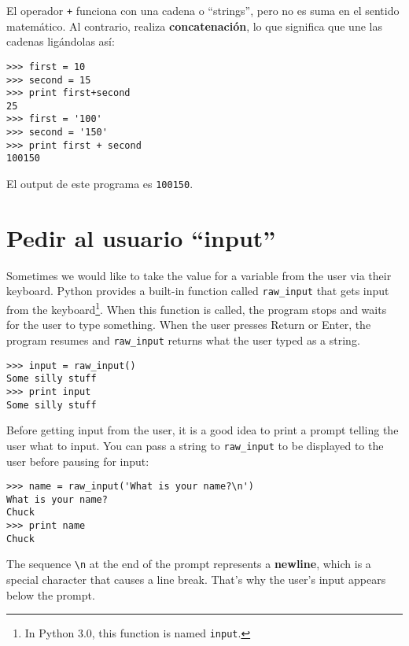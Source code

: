 \begin{ex}
El operador {\tt +} funciona con una cadena o ``strings'', pero no es suma en el sentido matem\'atico. Al contrario, realiza 
{\bf concatenaci\'on}, lo que significa que une las cadenas lig\'andolas as\'i:
















\beforeverb
\begin{verbatim}
>>> first = 10
>>> second = 15
>>> print first+second
25
>>> first = '100'
>>> second = '150'
>>> print first + second
100150
\end{verbatim}
\afterverb
%

El output de este programa es {\tt 100150}.

\section{Pedir al usuario ``input''}


Sometimes we would like to take the value for a variable from the user
via their keyboard.
Python provides a built-in function called \verb"raw_input" that gets
input from the keyboard\footnote{In Python 3.0, this function is named
  {\tt input}.}.  When this function is called, the program stops and
waits for the user to type something.  When the user presses {\sf
  Return} or {\sf Enter}, the program resumes and \verb"raw_input"
returns what the user typed as a string.


\beforeverb
\begin{verbatim}
>>> input = raw_input()
Some silly stuff
>>> print input
Some silly stuff
\end{verbatim}
\afterverb
%
Before getting input from the user, it is a good idea to print a
prompt telling the user what to input.  You can pass a string
to \verb"raw_input" to be displayed to the user before pausing
for input:


\beforeverb
\begin{verbatim}
>>> name = raw_input('What is your name?\n')
What is your name?
Chuck
>>> print name
Chuck
\end{verbatim}
\afterverb
%
The sequence \verb"\n" at the end of the prompt represents a {\bf newline},
which is a special character that causes a line break.
That's why the user's input appears below the prompt.


\end{ex}
